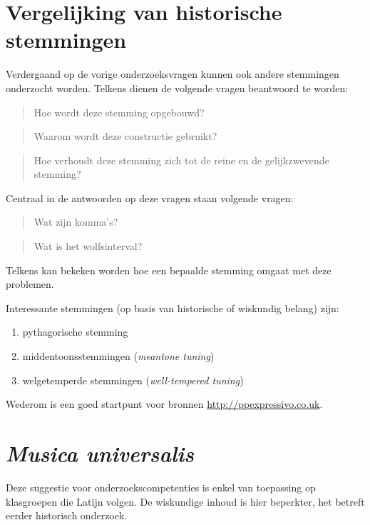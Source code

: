 \documentclass[10pt,a4paper]{article}
\begin{document}
\section{Vergelijking van historische stemmingen}
Verdergaand op de vorige onderzoeksvragen kunnen ook andere stemmingen onderzocht worden. Telkens dienen de volgende vragen beantwoord te worden:
\begin{quote}
  Hoe wordt deze stemming opgebouwd?
\end{quote}
\begin{quote}
  Waarom wordt deze constructie gebruikt?
\end{quote}
\begin{quote}
  Hoe verhoudt deze stemming zich tot de reine en de gelijkzwevende stemming?
\end{quote}
Centraal in de antwoorden op deze vragen staan volgende vragen:
\begin{quote}
  Wat zijn komma's?
\end{quote}
\begin{quote}
  Wat is het wolfsinterval?
\end{quote}
Telkens kan bekeken worden hoe een bepaalde stemming omgaat met deze problemen.

Interessante stemmingen (op basis van historische of wiskundig belang) zijn:
\begin{enumerate}
  \item pythagorische stemming
  \item middentoonsstemmingen (\emph{meantone tuning})
  \item welgetemperde stemmingen (\emph{well-tempered tuning})
\end{enumerate}

Wederom is een goed startpunt voor bronnen \url{http://ppexpressivo.co.uk}.


\section{\emph{Musica universalis}}
Deze suggestie voor onderzoekscompetenties is enkel van toepassing op klasgroepen die Latijn volgen. De wiskundige inhoud is hier beperkter, het betreft eerder historisch onderzoek.
\end{document}
